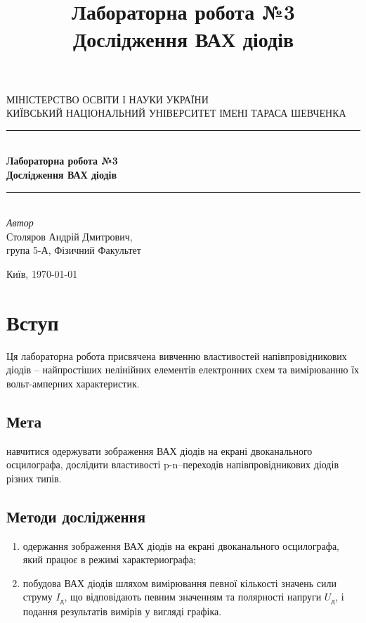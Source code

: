 \documentclass[
  ukrainian,
  14pt
]{extreport}
\author{}
\title{\Huge Лабораторна робота №3 \\\Large Дослідження ВАХ діодів}
\date{}
\begin{document}
\begin{titlepage} 
	\newcommand{\HRule}{\rule{\linewidth}{0.5mm}} 
	
	\center 
	
	\textsc{\Large МІНІСТЕРСТВО ОСВІТИ І НАУКИ УКРАЇНИ\\ \Large КИЇВСЬКИЙ НАЦІОНАЛЬНИЙ УНІВЕРСИТЕТ ІМЕНІ ТАРАСА ШЕВЧЕНКА}\\[1.5cm] 

	
	\HRule\\[0.4cm]
	
	{\huge \bfseries  Лабораторна робота №3 \\\Large \bfseries Дослідження ВАХ діодів
    }\\[0.4cm]
	
	\HRule\\[1.5cm]

	
	

	{\large\textit{Автор}}\\
	\large Столяров Андрій Дмитрович, \\\large група 5-А, Фізичний Факультет 
	
	
	\vfill\vfill\vfill 
	\vfill
	{\normalsize Київ, \today} 
\end{titlepage}
\tableofcontents
\clearpage
\section{Вступ}
Ця
 лабораторна
 робота
 присвячена
 вивченню
 властивостей
напівпровідникових діодів – найпростіших нелінійних елементів електронних
схем та вимірюванню їх вольт-амперних характеристик.

\subsection{Мета}
навчитися одержувати зображення ВАХ діодів на екрані
двоканального осцилографа,  дослідити
 властивості
 p-n–переходів
напівпровідникових діодів різних типів.

\subsection{Методи дослідження}
\begin{enumerate}
    \item одержання зображення ВАХ діодів на екрані
    двоканального осцилографа, який працює в режимі характериографа;
    \item побудова ВАХ діодів шляхом вимірювання певної кількості значень сили
    струму $I_{\text{д}}$, що відповідають певним значенням та полярності напруги $U_{\text{д}}$, і
    подання результатів вимірів у вигляді графіка.
\end{enumerate}
\end{document}
